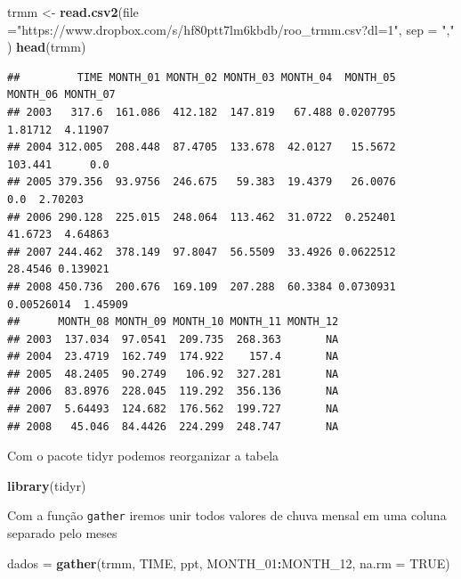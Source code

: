 \documentclass[
]{book}
\newenvironment{Shaded}{\begin{snugshade}}{\end{snugshade}}
\newcommand{\DataTypeTok}[1]{\textcolor[rgb]{0.13,0.29,0.53}{#1}}
\newcommand{\DecValTok}[1]{\textcolor[rgb]{0.00,0.00,0.81}{#1}}
\newcommand{\KeywordTok}[1]{\textcolor[rgb]{0.13,0.29,0.53}{\textbf{#1}}}
\newcommand{\NormalTok}[1]{#1}
\newcommand{\OperatorTok}[1]{\textcolor[rgb]{0.81,0.36,0.00}{\textbf{#1}}}
\newcommand{\OtherTok}[1]{\textcolor[rgb]{0.56,0.35,0.01}{#1}}
\newcommand{\StringTok}[1]{\textcolor[rgb]{0.31,0.60,0.02}{#1}}
\begin{document}
\begin{Shaded}
\begin{Highlighting}[]
\NormalTok{trmm <-}\StringTok{ }\KeywordTok{read.csv2}\NormalTok{(}\DataTypeTok{file =}\StringTok{"https://www.dropbox.com/s/hf80ptt7lm6kbdb/roo_trmm.csv?dl=1"}\NormalTok{, }\DataTypeTok{sep =} \StringTok{","}\NormalTok{ )}
\KeywordTok{head}\NormalTok{(trmm)}
\end{Highlighting}
\end{Shaded}

\begin{verbatim}
##         TIME MONTH_01 MONTH_02 MONTH_03 MONTH_04  MONTH_05   MONTH_06 MONTH_07
## 2003   317.6  161.086  412.182  147.819   67.488 0.0207795    1.81712  4.11907
## 2004 312.005  208.448  87.4705  133.678  42.0127   15.5672    103.441      0.0
## 2005 379.356  93.9756  246.675   59.383  19.4379   26.0076        0.0  2.70203
## 2006 290.128  225.015  248.064  113.462  31.0722  0.252401    41.6723  4.64863
## 2007 244.462  378.149  97.8047  56.5509  33.4926 0.0622512    28.4546 0.139021
## 2008 450.736  200.676  169.109  207.288  60.3384 0.0730931 0.00526014  1.45909
##      MONTH_08 MONTH_09 MONTH_10 MONTH_11 MONTH_12
## 2003  137.034  97.0541  209.735  268.363       NA
## 2004  23.4719  162.749  174.922    157.4       NA
## 2005  48.2405  90.2749   106.92  327.281       NA
## 2006  83.8976  228.045  119.292  356.136       NA
## 2007  5.64493  124.682  176.562  199.727       NA
## 2008   45.046  84.4426  224.299  248.747       NA
\end{verbatim}

Com o pacote tidyr podemos reorganizar a tabela

\begin{Shaded}
\begin{Highlighting}[]
\KeywordTok{library}\NormalTok{(tidyr)}
\end{Highlighting}
\end{Shaded}

Com a função \texttt{gather} iremos unir todos valores de chuva mensal em uma coluna separado pelo meses

\begin{Shaded}
\begin{Highlighting}[]
\NormalTok{dados =}\StringTok{ }\KeywordTok{gather}\NormalTok{(trmm, TIME, ppt, MONTH_}\DecValTok{01}\OperatorTok{:}\NormalTok{MONTH_}\DecValTok{12}\NormalTok{, }\DataTypeTok{na.rm =} \OtherTok{TRUE}\NormalTok{)}
\end{Highlighting}
\end{Shaded}
\end{document}

